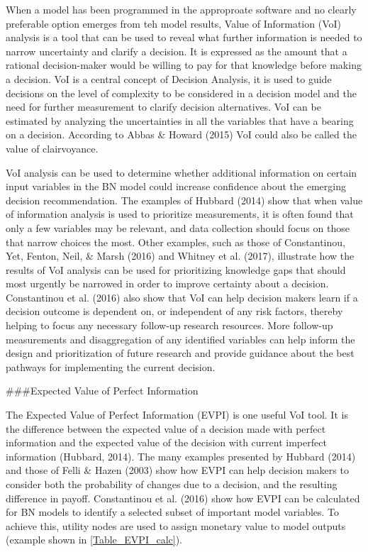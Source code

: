 \documentclass[
]{article}
\begin{document}
When a model has been programmed in the approproate software and no
clearly preferable option emerges from teh model results, Value of
Information (VoI) analysis is a tool that can be used to reveal what
further information is needed to narrow uncertainty and clarify a
decision. It is expressed as the amount that a rational decision-maker
would be willing to pay for that knowledge before making a decision. VoI
is a central concept of Decision Analysis, it is used to guide decisions
on the level of complexity to be considered in a decision model and the
need for further measurement to clarify decision alternatives. VoI can
be estimated by analyzing the uncertainties in all the variables that
have a bearing on a decision. According to Abbas \& Howard (2015) VoI
could also be called the value of clairvoyance.

VoI analysis can be used to determine whether additional information on
certain input variables in the BN model could increase confidence about
the emerging decision recommendation. The examples of Hubbard (2014)
show that when value of information analysis is used to prioritize
measurements, it is often found that only a few variables may be
relevant, and data collection should focus on those that narrow choices
the most. Other examples, such as those of Constantinou, Yet, Fenton,
Neil, \& Marsh (2016) and Whitney et al. (2017), illustrate how the
results of VoI analysis can be used for prioritizing knowledge gaps that
should most urgently be narrowed in order to improve certainty about a
decision. Constantinou et al. (2016) also show that VoI can help
decision makers learn if a decision outcome is dependent on, or
independent of any risk factors, thereby helping to focus any necessary
follow-up research resources. More follow-up measurements and
disaggregation of any identified variables can help inform the design
and prioritization of future research and provide guidance about the
best pathways for implementing the current decision.

\#\#\#Expected Value of Perfect Information

The Expected Value of Perfect Information (EVPI) is one useful VoI tool.
It is the difference between the expected value of a decision made with
perfect information and the expected value of the decision with current
imperfect information (Hubbard, 2014). The many examples presented by
Hubbard (2014) and those of Felli \& Hazen (2003) show how EVPI can help
decision makers to consider both the probability of changes due to a
decision, and the resulting difference in payoff. Constantinou et al.
(2016) show how EVPI can be calculated for BN models to identify a
selected subset of important model variables. To achieve this, utility
nodes are used to assign monetary value to model outputs (example shown
in \autoref{Table_EVPI_calc}).
\end{document}
